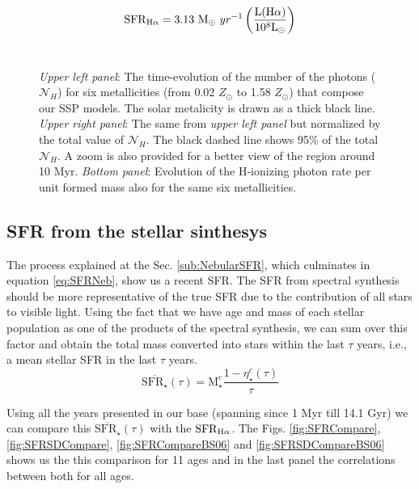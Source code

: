 \documentclass[a4paper,11pt]{article}
\begin{document}
\begin{equation}
	\label{eq:SFRNeb}
	\mathrm{SFR}_{\Halpha} = 3.13\ \mathrm{M}_\odot\ yr^{-1} \left(\frac{\mathrm{L}(\Halpha)}{10^8\mathrm{L}_\odot}\right)
\end{equation}
\
\begin{figure*}
\caption{\emph{Upper left panel}: The time-evolution of the number of the photons ($\mathcal{N}_H$) for six metallicities (from 0.02 $Z_\odot$ to 1.58 $Z_\odot$) that compose our SSP models. The solar metalicity is drawn as a thick black line. \emph{Upper right panel}: The same from \emph{upper left panel} but normalized by the total value of $\mathcal{N}_H$. The black dashed line shows 95\% of the total $\mathcal{N}_H$. A zoom is also provided for a better view of the region around 10 Myr. \emph{Bottom panel}: Evolution of the H-ionizing photon rate per unit formed mass also for the same six metallicities.}
\label{fig:Nh_qh}
\end{figure*}

\subsection{SFR from the stellar sinthesys}
\label{sub:StellarSFR}
The process explained at the Sec. \ref{sub:NebularSFR}, which culminates in equation \eqref{eq:SFRNeb}, show us a recent SFR.  The SFR from spectral synthesis should be more representative of the true SFR due to the contribution of all stars to visible light. Using the fact that we have age and mass of each stellar population as one of the products of the spectral synthesis, we can sum over this factor and obtain the total mass converted into stars within the last $\tau$ years, i.e., a mean stellar SFR in the last $\tau$ years.
\begin{equation}
	\label{eq:MeanStellarSFR}
	\overline{\mathrm{SFR}_\star}(\tau) = \mathrm{M}_\star^c \frac{1 - \eta_\star^c(\tau)}{\tau}
\end{equation}

Using all the years presented in our base (spanning since 1 Myr till 14.1 Gyr) we can compare this $\overline{\mathrm{SFR}_\star}(\tau)$ with the $\mathrm{SFR}_{\Halpha}$. The Figs. \ref{fig:SFRCompare}, \ref{fig:SFRSDCompare}, \ref{fig:SFRCompareBS06} and \ref{fig:SFRSDCompareBS06} shows us the this comparison for 11 ages and in the last panel the correlations between both for all ages. 
\end{document}
